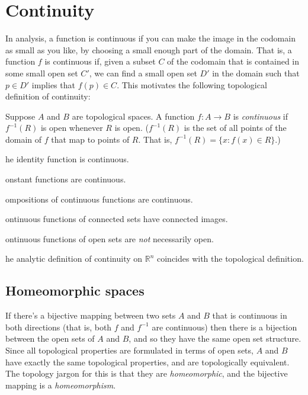 \documentclass{article}
\def\R{{\mathbb R}}
\def\Rn{{\R^n}}
\newcounter{exercisecounter}\setcounter{exercisecounter}{1}
\def\Exercise.#1\par{{\item\small {\bf Exercise \number\theexercisecounter}.#1\addtocounter{exercisecounter}{1}}}
\begin{document}
\section*{Continuity}

In analysis, a function is continuous if you can make the image in the
codomain as small as you like, by choosing a small enough part of the
domain.  That is, a function $f$ is continuous if, given a subset $C$
of the codomain that is contained in some small open set $C'$, we can
find a small open set $D'$ in the domain such that $p\in D'$ implies
that $f(p)\in C$.  This motivates the following topological definition
of continuity:

Suppose $A$ and $B$ are topological spaces.  A function $f : A\to B$
is {\em continuous\/} if $f^{-1}(R)$ is open whenever $R$ is open.
($f^{-1}(R)$ is the set of all points of the domain of $f$ that map to
points of $R$.  That is, $f^{-1}(R) = \{ x : f(x)\in R \}$.)

\begin{itemize}
\Exercise. The identity function is continuous.

\Exercise. Constant functions are continuous.

\Exercise. Compositions of continuous functions are continuous.

\Exercise. Continuous functions of connected sets have connected images.

\Exercise. Continuous functions of open sets are {\em not\/} necessarily open.

\Exercise. The analytic definition of continuity on $\Rn$ coincides with the
topological definition.

\end{itemize}

\subsection*{Homeomorphic spaces}

If there's a bijective mapping between two sets $A$ and $B$ that is
continuous in both directions (that is, both $f$ and $f^{-1}$ are
continuous) then there is a bijection between the open sets of $A$ and
$B$, and so they have the same open set structure.  Since all
topological properties are formulated in terms of open sets, $A$ and
$B$ have exactly the same topological properties, and are
topologically equivalent.  The topology jargon for this is that they
are {\em homeomorphic\/}, and the bijective mapping is a {\em 
homeomorphism\/}. 
\end{document}
